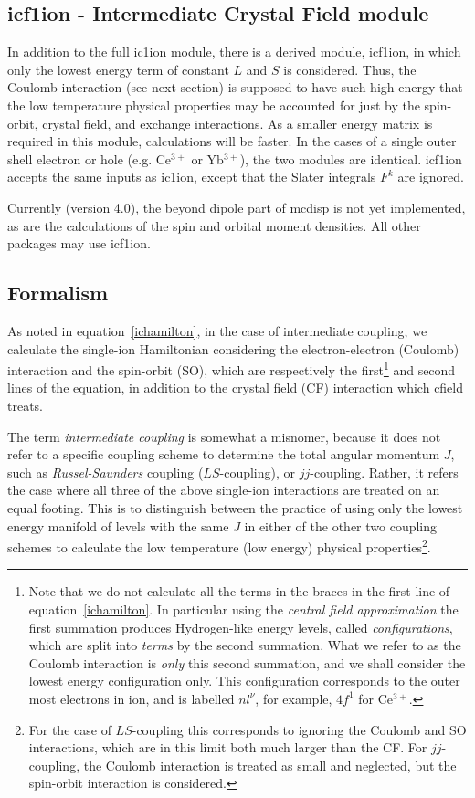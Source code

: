 \subsection{{\prg icf1ion} - Intermediate Crystal Field module}

In addition to the full {\prg ic1ion} module, there is a derived module, {\prg icf1ion}, in which only the lowest
energy term of constant $L$ and $S$ is considered. Thus, the Coulomb interaction (see next section) is supposed
to have such high energy that the low temperature physical properties may be accounted for just by the spin-orbit,
crystal field, and exchange interactions. As a smaller energy matrix is required in this module, calculations will
be faster. In the cases of a single outer shell electron or hole (e.g. Ce$^{3+}$ or Yb$^{3+}$), the two modules are 
identical. {\prg icf1ion} accepts the same inputs as {\prg ic1ion}, except that the Slater integrals $F^k$ are 
ignored. 

Currently (version 4.0), the beyond dipole part of {\prg mcdisp} is not yet implemented, as are the calculations
of the spin and orbital moment densities. All other packages may use {\prg icf1ion}.

\subsection{Formalism}

As noted in equation~\ref{ichamilton}, in the case of intermediate coupling, we calculate
the single-ion Hamiltonian considering the electron-electron (Coulomb) interaction and the
spin-orbit (SO), which are respectively the first\footnote{Note that we do not calculate all the
terms in the braces in the first line of equation~\ref{ichamilton}. In particular using the
\emph{central field approximation} the first summation produces Hydrogen-like energy levels, called
\emph{configurations}, which are split into \emph{terms} by the second summation. What we refer to
as the Coulomb interaction is \emph{only} this second summation, and we shall consider the lowest
energy configuration only. This configuration corresponds to the outer most electrons in ion, and is
labelled $nl^\nu$, for example, $4f^1$ for Ce$^{3+}$.} and second lines of the equation, in addition
to the crystal field (CF) interaction which {\prg cfield} treats. 

The term \emph{intermediate coupling} is somewhat a misnomer, because it does not refer to a
specific coupling scheme to determine the total angular momentum $J$, such as
\emph{Russel-Saunders} coupling ($LS$-coupling), or $jj$-coupling. Rather, it refers the case where all
three of the above single-ion interactions are treated on an equal footing. This is to distinguish
between the practice of using only the lowest energy manifold of levels with the same $J$ in either
of the other two coupling schemes to calculate the low temperature (low energy) physical
properties\footnote{For the case of $LS$-coupling this corresponds to ignoring the Coulomb and SO
interactions, which are in this limit both much larger than the CF. For $jj$-coupling, the Coulomb
interaction is treated as small and neglected, but the spin-orbit interaction is considered.}.

